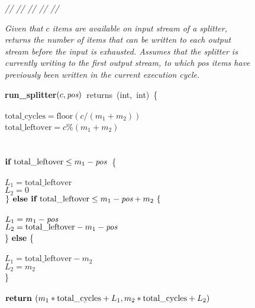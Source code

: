 \begin{figure}[t]
\begin{minipage}{0.1in}
\vspace{-1.75pt}
{\it // // // // //}
\end{minipage}
\begin{minipage}{3.23in}
{\it Given that $c$ items are available on input stream of a splitter,
  returns the number of items that can be written to each output stream
  before the input is exhausted.
  Assumes that the splitter is currently writing to the first output
  stream, to which \mbox{pos} items have previously been written in
  the current execution cycle.}
\end{minipage}
\mbox{\bf run\_splitter}$(c, \mbox{\it pos} )$~returns~(int,~int)~\{\\
\\
\tab$\mbox{total\_cycles} = \mbox{floor}(c/(m_1 + m_2))$\\
\tab$\mbox{total\_leftover} = c$\%$(m_1 + m_2)$\\
~ \vspace{-6pt}\\ 
\\
\tab$\mbox{\bf if~} \mbox{total\_leftover} \leq m_1 - \mbox{\it pos}$~\{\\
\tab{}\\
\tab\tab$L_1 = \mbox{total\_leftover}$\\
\tab\tab$L_2 = 0$\\
\tab$\} \mbox{\bf~else if~} \mbox{total\_leftover} \leq m_1-\mbox{\it pos} + m_2~\{$\\
\tab{}\\
\tab\tab$L_1 = m_1-\mbox{\it pos}$\\
\tab\tab$L_2 = \mbox{total\_leftover} - m_1-\mbox{\it pos}$\\
\tab\} \mbox{\bf else} \{\\
\tab{}\\
\tab\tab$L_1 = \mbox{total\_leftover} - m_2$\\
\tab\tab$L_2 = m_2$\\
\tab\}\\
~ \vspace{-6pt}\\
\tab$\mbox{\bf return~}(m_1*\mbox{total\_cycles} + L_1, m_2*\mbox{total\_cycles} + L_2)$

\end{figure}
